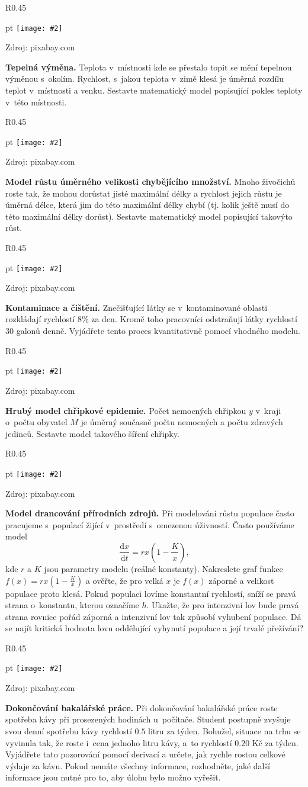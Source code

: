 \documentclass{article}
\newcommand\obrazek[2][pixabay.com]{
  \clearpage
\begin{wrapfigure}{R}{0.45\linewidth}
  \begin{minipage}{1.0\linewidth}\parskip 0 pt
  \texttt{[image: \#2]}

  \vspace*{-10pt}
  \null\hfill{\color{gray}\footnotesize Zdroj: #1}
    
  \end{minipage}
\end{wrapfigure}
}
\let\oldtextbf\textbf
\def\textbf#1{%
  \oldtextbf{\color{red} #1}}
\begin{document}
\obrazek{room.jpg}
\textbf{Tepelná výměna.}  Teplota v místnosti kde se přestalo topit se mění
tepelnou výměnou s okolím. Rychlost, s jakou teplota v zimě klesá je
úměrná rozdílu teplot v místnosti a venku. Sestavte matematický model
popisující pokles teploty v této místnosti.


\obrazek{mladata.jpg}
\textbf{Model růstu úměrného velikosti chybějícího množství.}  Mnoho
živočichů roste tak, že mohou dorůstat jisté maximální délky a
rychlost jejich růstu je úměrná délce, která jim do této maximální
délky chybí (tj. kolik ještě musí do této maximální délky
dorůst). Sestavte matematický model popisující takovýto růst.


\obrazek{kontaminace.jpg}
\textbf{Kontaminace a čištění.}
Znečišťující látky se v kontaminované oblasti rozkládají rychlostí
$8\%$ za den. Kromě toho pracovníci odstraňují látky rychlostí $30$
galonů denně. Vyjádřete tento proces kvantitativně pomocí vhodného
modelu.

\obrazek{nemoc.jpg}
\textbf{Hrubý model chřipkové epidemie.}  Počet nemocných chřipkou $y$ v kraji o počtu obyvatel $M$ je úměrný současně počtu nemocných a počtu zdravých
jedinců. Sestavte model takového šíření chřipky.


\obrazek{lov.jpg}
\textbf{Model drancování přírodních zdrojů.}
Při modelování růstu populace často pracujeme s populací žijící v prostředí s omezenou úživností. Často používáme model
$$\frac{\mathrm d x}{\mathrm dt}=rx\left(1-\frac Kx\right),$$
kde $r$ a $K$ jsou parametry modelu (reálné konstanty).  Nakreslete
graf funkce $f(x)=rx\left(1-\frac Kx\right)$ a ověřte, že pro velká
$x$ je $f(x)$ záporné a velikost populace proto klesá. Pokud populaci
lovíme konstantní rychlostí, sníží se pravá strana o konstantu, kterou
označíme $h$. Ukažte, že pro intenzivní lov bude pravá strana rovnice
pořád záporná a intenzivní lov tak způsobí vyhubení populace. Dá se
najít kritická hodnota lovu oddělující vyhynutí populace a její
trvalé přežívání?

\obrazek{kafe.jpg}
\textbf{Dokončování bakalářské práce.} Při dokončování bakalářské
práce roste spotřeba kávy při prosezených hodinách u počítače. Student
postupně zvyšuje svou denní spotřebu kávy rychlostí $0.5$ litru za
týden. Bohužel, situace na trhu se vyvinula tak, že roste i cena
jednoho litru kávy, a to rychlostí $0.20$ Kč za týden. Vyjádřete tato
pozorování pomocí derivací a určete, jak rychle rostou celkové výdaje
za kávu. Pokud nemáte všechny informace, rozhodněte, jaké další
informace jsou nutné pro to, aby úlohu bylo možno vyřešit.
\end{document}
